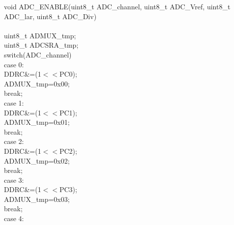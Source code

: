 \documentclass[titlepage, a4paper, 10pt, reqno, openany]{report}
\begin{document}
\vline \quad
\begin{minipage}[t]{.3\linewidth}
	\tiny
	void ADC\_ENABLE(uint8\_t ADC\_channel, uint8\_t ADC\_Vref, uint8\_t ADC\_lar, uint8\_t ADC\_Div) \\
	\textbraceleft \\
	\hspace*{.5cm}	uint8\_t ADMUX\_tmp; \\
	\hspace*{.5cm}	uint8\_t ADCSRA\_tmp; \\
	\hspace*{.5cm}	switch(ADC\_channel)\textbraceleft \\
	\hspace*{1cm}		case 0: \\
	\hspace*{1.5cm}			DDRC\&=\texttildelow (1$<<$PC0); \\
	\hspace*{1.5cm}			ADMUX\_tmp=0x00; \\
	\hspace*{1.5cm}			break; \\
	\hspace*{1cm}		case 1: \\
	\hspace*{1.5cm}			DDRC\&=\texttildelow (1$<<$PC1); \\
	\hspace*{1.5cm}			ADMUX\_tmp=0x01; \\
	\hspace*{1.5cm}			break; \\
	\hspace*{1cm}		case 2: \\
	\hspace*{1.5cm}			DDRC\&=\texttildelow (1$<<$PC2); \\
	\hspace*{1.5cm}			ADMUX\_tmp=0x02; \\
	\hspace*{1.5cm}			break; \\
	\hspace*{1cm}		case 3: \\
	\hspace*{1.5cm}			DDRC\&=\texttildelow (1$<<$PC3); \\
	\hspace*{1.5cm}			ADMUX\_tmp=0x03; \\
	\hspace*{1.5cm}			break; \\
	\hspace*{1cm}		case 4: \\

\end{minipage}
\end{document}
